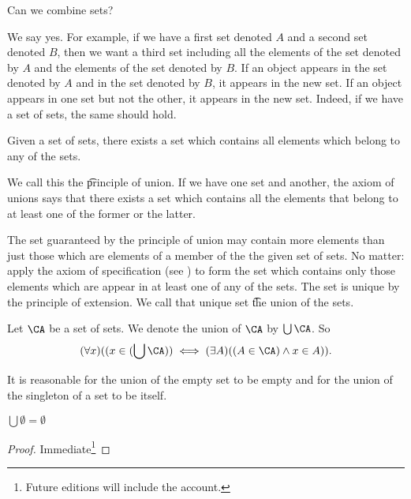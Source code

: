 

Can we combine sets?


We say yes. 
For example, if we have a first set denoted $A$ and a second set denoted $B$, then we want a third set including all the elements of the set denoted by $A$ and the elements of the set denoted by $B$.
If an object appears in the set denoted by $A$ and in the set denoted by $B$, it appears in the new set.
If an object appears in one set but not the other, it appears in the new set.
Indeed, if we have a set of sets, the same should hold.

\begin{principle}[Union]
	Given a set of sets, there exists a set which contains all elements which belong to any of the sets.	
\end{principle}
We call this the \t{principle of union}.
If we have one set and another, the axiom of unions says that there exists a set which contains all the elements that belong to at least one of the former or the latter.

The set guaranteed by the principle of union may contain more elements than just those which are elements of a member of the the given set of sets.
No matter: apply the axiom of specification (see ) to form the set which contains only those elements which are appear in at least one of any of the sets.
The set is unique by the principle of extension.
We call that unique set \t{the union} of the sets.


Let $\CA$ be a set of sets.
We denote the union of $\CA$ by $\bigcup \CA$.
So 
\[
	(\forall x)((x \in (\bigcup\CA)) \iff (\exists A)((A \in \CA) \land x \in A)).
\]


It is reasonable for the union of the empty set to be empty and for the union of the singleton of a set to be itself.

\begin{prop}
	$\bigcup \emptyset = \emptyset$
\end{prop}
\begin{proof}
Immediate\footnote{Future editions will include the account.}
\end{proof}

